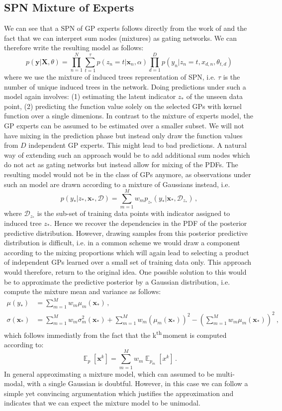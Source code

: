 \documentclass[10pt,letterpaper]{article}
\newcommand{\ths}{\textsuperscript{th}{\,}}
\DeclareMathOperator{\E}{\mathbb{E}}
\newcommand{\X}{\mathbf{X}}
\newcommand{\data}{\mathcal{D}}
\newcommand{\x}{\mathbf{x}}
\newcommand{\y}{\mathbf{y}}
\newcommand{\xn}{\mathbf{x}_{n}}
\newcommand{\new}{_{*}}
\theoremstyle{mystyle}
\begin{document}
\subsection{SPN Mixture of Experts}
We can see that a SPN of GP experts follows directly from the work of \cite{RasmussenG2001} and the fact that we can interpret sum nodes (mixtures) as gating networks.
We can therefore write the resulting model as follows:
\[
  p(\y | \X, \theta) = \prod_{n=1}^N \sum_{t=1}^{\tau} p(z_n = t | \xn, \alpha) \prod_{d=1}^D p(y_n | z_n = t, x_{d,n}, \theta_{t,d})
\]
where we use the mixture of induced trees representation of SPN, i.e. $\tau$ is the number of unique induced trees in the network.
Doing predictions under such a model again involves: (1) estimating the latent indicator $z\new$ of the unseen data point, (2) predicting the function value solely on the selected GPs with kernel function over a single dimenions.
In contrast to the mixture of experts model, the GP experts can be assumed to be estimated over a smaller subset.
We will not have mixing in the prediction phase but instead only draw the function values from $D$ independent GP experts. 
This might lead to bad predictions.
A natural way of extending such an approach would be to add additional sum nodes which do not act as gating networks but instead allow for mixing of the PDFs.
The resulting model would not be in the class of GPs anymore, as observations under such an model are drawn according to a mixture of Gaussians instead, i.e.
\[
  p(y\new | z\new, \x\new, \data) = \sum_{m=1}^M w_m p_{z\new}(y\new | \x\new, \data_{z\new}) \, ,
\]
where $\data_{z\new}$ is the sub-set of training data points with indicator assigned to induced tree $z\new$. Hence we recover the dependencies in the PDF of the posterior predictive distribution. However, drawing samples from this posterior predictive distribution is difficult, i.e. in a common scheme we would draw a component according to the mixing proportions which will again lead to selecting a product of independent GPs learned over a small set of training data only. 
This approach would therefore, return to the original idea.
One possible solution to this would be to approximate the predictive posterior by a Gaussian distribution, i.e. compute the mixture mean and variance as follows: 
\begin{align}
  \mu(y\new) &= \sum_{m=1}^M w_m \mu_m(\x\new) \, , \\
  \sigma(\x\new) &= \sum_{m=1}^M w_m \sigma^2_m(\x\new) + \sum_{m=1}^M w_m (\mu_m(\x\new))^2 - \left(\sum_{m=1}^M w_m \mu_m(\x\new)\right)^2\ ,
\end{align}
which follows immediatly from the fact that the k\ths moment is computed according to:
\[
  \E_{p}[\x^k] = \sum_{m=1}^M w_m \E_{p_m}[x^k] \, .
\]
In general approximating a mixture model, which can assumed to be multi-modal, with a single Gaussian is doubtful.
However, in this case we can follow a simple yet convincing argumentation which justifies the approximation and indicates that we can expect the mixture model to be unimodal.
\end{document}
